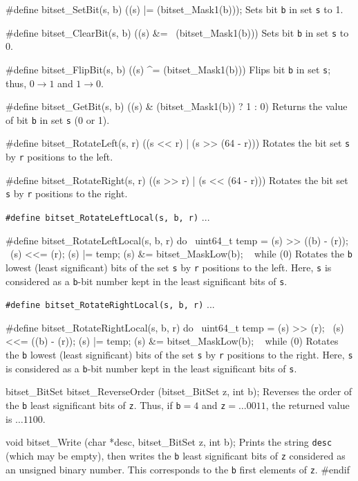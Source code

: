 #define bitset_SetBit(s, b) ((s) |= (bitset_Mask1(b)));
\endcode
 \tab  Sets bit {\tt b} in set  {\tt s}  to 1.
 \endtab
\code

#define bitset_ClearBit(s, b) ((s) &= ~(bitset_Mask1(b)))
\endcode
 \tab  Sets bit {\tt b} in set  {\tt s}  to 0.
 \endtab
\code

#define bitset_FlipBit(s, b) ((s) ^= (bitset_Mask1(b)))
\endcode
 \tab  Flips bit {\tt b} in set {\tt s};  thus,
        $0 \rightarrow 1$ and $1 \rightarrow 0$.
 \endtab
\code

#define bitset_GetBit(s, b)  ((s) & (bitset_Mask1(b)) ? 1 : 0)
\endcode
 \tab  Returns the value of bit {\tt b} in set {\tt s} (0 or 1).
 \endtab
\code

#define bitset_RotateLeft(s, r)  ((s << r) | (s >> (64 - r)))
\endcode
 \tab  Rotates the bit set {\tt s} by {\tt r} positions to the left.
 \endtab
\code

#define bitset_RotateRight(s, r)  ((s >> r) | (s << (64 - r)))
\endcode
 \tab  Rotates the bit set {\tt s} by {\tt r} positions to the right.
\endtab

\noindent
{\tt\#define bitset\_RotateLeftLocal(s, b, r)}  ...

\hide\code
#define bitset_RotateLeftLocal(s, b, r) do { \
   uint64_t temp = (s) >> ((b) - (r)); \
   (s) <<= (r);   (s) |= temp;   (s) &= bitset_MaskLow(b); \
   } while (0)
\endcode\endhide
\tab  Rotates the {\tt b} lowest (least significant) bits of
  the set {\tt s} by {\tt r} positions to the left.
  Here, {\tt s} is considered as a {\tt b}-bit number kept
  in the least significant bits of {\tt s}.
 \endtab

\noindent
{\tt\#define bitset\_RotateRightLocal(s, b, r)}  ...

\hide\code
#define bitset_RotateRightLocal(s, b, r) do { \
   uint64_t temp = (s) >> (r); \
   (s) <<= ((b) - (r));   (s) |= temp;   (s) &= bitset_MaskLow(b); \
   } while (0)
\endcode\endhide
 \tab  Rotates the {\tt b} lowest (least significant) bits of
  the set {\tt s} by {\tt r} positions to the right.
  Here, {\tt s} is considered as a {\tt b}-bit number kept
  in the least significant bits of {\tt s}.
 \endtab


\guisec{Prototypes}
\code

bitset_BitSet bitset_ReverseOrder (bitset_BitSet z, int b);
\endcode
\tab Reverses the order of the {\tt b} least significant bits of {\tt z}.
  Thus, if {\tt b}${}=4$ and {\tt z}${} = \dots 0011$, the returned value is $\dots 1100$.
 \endtab
\code

void bitset_Write (char *desc, bitset_BitSet z, int b);
\endcode
  \tab  {}
  Prints the string {\tt desc} (which may be empty), then writes the {\tt b}
	least significant bits of {\tt z} considered as an unsigned binary number.
  This corresponds to the {\tt b} first elements of {\tt z}.
 \endtab
\code\hide
#endif
\endhide\endcode
